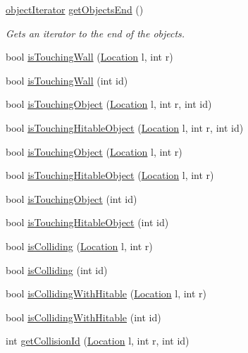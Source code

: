 \begin{DoxyCompactItemize}
\hyperlink{namespaceenvironment_a3a7a388d4b4ceb0a34bf0c72579780e1}{object\-Iterator} \hyperlink{namespaceenvironment_aa9316445a3ee5c897df2bb6f7892069a}{get\-Objects\-End} ()
\begin{DoxyCompactList}\small\item\em Gets an iterator to the end of the objects. \end{DoxyCompactList}\item 
bool \hyperlink{namespaceenvironment_a113b0996be39cc900966f3c71398ff3f}{is\-Touching\-Wall} (\hyperlink{structLocation}{Location} l, int r)
\item 
bool \hyperlink{namespaceenvironment_a67da8bd372b3d5f78908cbe36568a96f}{is\-Touching\-Wall} (int id)
\item 
bool \hyperlink{namespaceenvironment_a7769cee3c77ed08a6e2f47bcef8d76e7}{is\-Touching\-Object} (\hyperlink{structLocation}{Location} l, int r, int id)
\item 
bool \hyperlink{namespaceenvironment_a9569646b039f32a98afb69ff3a6ed228}{is\-Touching\-Hitable\-Object} (\hyperlink{structLocation}{Location} l, int r, int id)
\item 
bool \hyperlink{namespaceenvironment_a4a54789c59de86e474668c53245f0a84}{is\-Touching\-Object} (\hyperlink{structLocation}{Location} l, int r)
\item 
bool \hyperlink{namespaceenvironment_ae366aba4972fe1073a477c5aabb724c4}{is\-Touching\-Hitable\-Object} (\hyperlink{structLocation}{Location} l, int r)
\item 
bool \hyperlink{namespaceenvironment_aaaeaf16534f26b06d9684fa077701e8d}{is\-Touching\-Object} (int id)
\item 
bool \hyperlink{namespaceenvironment_a8ce8be445c948e6c6f346e1abb1063de}{is\-Touching\-Hitable\-Object} (int id)
\item 
bool \hyperlink{namespaceenvironment_a73988f1cc00df0e77d67cd306469168b}{is\-Colliding} (\hyperlink{structLocation}{Location} l, int r)
\item 
bool \hyperlink{namespaceenvironment_a636bf120445810e363d967fee72cc4f9}{is\-Colliding} (int id)
\item 
bool \hyperlink{namespaceenvironment_a0dbd900478d4838132395dcf881e9b19}{is\-Colliding\-With\-Hitable} (\hyperlink{structLocation}{Location} l, int r)
\item 
bool \hyperlink{namespaceenvironment_a6957694956f081e560b07d91734598ed}{is\-Colliding\-With\-Hitable} (int id)
\item 
int \hyperlink{namespaceenvironment_ace3407a2775d185a81d663dc2600ede9}{get\-Collision\-Id} (\hyperlink{structLocation}{Location} l, int r, int id)

\end{DoxyCompactItemize}
